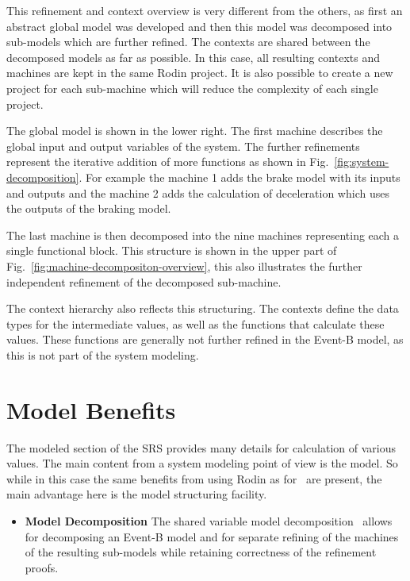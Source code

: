 \documentclass{template/openetcs_article}
\begin{document}
This refinement and context overview is very different from the others, as first
an abstract global model was developed and then this model was decomposed into
sub-models which are further refined. The contexts are shared between the
decomposed models as far as possible. In this case, all resulting contexts and
machines are kept in the same Rodin project. It is also possible to create
a new project for each sub-machine which will reduce the complexity of each
single project.

The global model is shown in the lower right. The first machine describes the
global input and output variables of the system. The further refinements
represent the iterative addition of more functions as shown in
Fig.~\ref{fig:system-decomposition}. For example the machine 1 adds the brake
model with its inputs and outputs and the machine 2 adds the calculation of
deceleration which uses the outputs of the braking model.

The last machine is then decomposed into the nine machines representing each a
single functional block. This structure is shown in the upper part of
Fig.~\ref{fig:machine-decompositon-overview}, this also illustrates the further
independent refinement of the decomposed sub-machine.

The context hierarchy also reflects this structuring. The contexts define the
data types for the intermediate values, as well as the functions that calculate
these values. These functions are generally not further refined in the Event-B
model, as this is not part of the system modeling.

\section{Model Benefits}
\label{sec:model-highlights}

The modeled section of the SRS provides many details for calculation of various
values. The main content from a system modeling point of view is the model. So
while in this case the same benefits from using Rodin as
for~\cite{Section-3-5-Rodin,Section-4-6-Rodin,Section-5-9-Rodin} are present,
the main advantage here is the model structuring facility.

\begin{itemize}
\item {\bf Model Decomposition} The shared variable model
  decomposition~\cite{silva2011decomposition} allows for decomposing an Event-B
  model and for separate refining of the machines of the resulting
  sub-models while retaining correctness of the refinement proofs.
\end{itemize}
\end{document}
